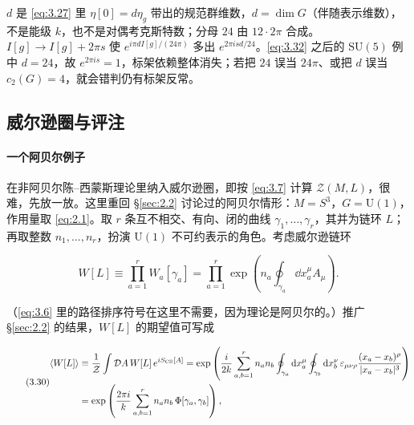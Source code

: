\begin{yizhu}[易错点]
$d$ 是 \eqref{eq:3.27} 里 $\eta[0]=d\eta_g$ 带出的规范群维数，$d=\dim G$（伴随表示维数），不是能级 $k$，也不是对偶考克斯特数；分母 $24$ 由 $12\cdot2\pi$ 合成。$I[g]\longrightarrow I[g]+2\pi s$ 使 $e^{i\pi dI[g]/(24\pi)}$ 多出 $e^{2\pi isd/24}$。\eqref{eq:3.32} 之后的 $\mathrm{SU}(5)$ 例中 $d=24$，故 $e^{2\pi is}=1$，标架依赖整体消失；若把 $24$ 误当 $24\pi$、或把 $d$ 误当 $c_2(G)=4$，就会错判仍有标架反常。
\end{yizhu}

\subsection{威尔逊圈与评注}\label{sec:3.4}

\paragraph{一个阿贝尔例子} 在非阿贝尔陈--西蒙斯理论里纳入威尔逊圈，即按 \eqref{eq:3.7} 计算 $\mathcal{Z}(M,L)$，很难，先放一放。这里重回 \S\ref{sec:2.2} 讨论过的阿贝尔情形：$M=S^3$，$G=\mathrm{U}(1)$，作用量取 \eqref{eq:2.1}。取 $r$ 条互不相交、有向、闭的曲线 $\gamma_1,\dots,\gamma_r$，其并为链环 $L$；再取整数 $n_1,\dots,n_r$，扮演 $\mathrm{U}(1)$ 不可约表示的角色。考虑威尔逊链环

\begin{equation}\tag{3.29}\label{eq:3.29}
  W[L] \equiv \prod_{a=1}^{r}W_a[\gamma_a]
  = \prod_{a=1}^{r}\exp\left(n_a\oint_{\gamma_a}\dd x_a^\mu A_\mu\right).
\end{equation}

（\eqref{eq:3.6} 里的路径排序符号在这里不需要，因为理论是阿贝尔的。）推广 \S\ref{sec:2.2} 的结果，$W[L]$ 的期望值可写成

\begin{equation}\tag{3.30}\label{eq:3.30}
\begin{aligned}
  \langle W[L]\rangle
  &\equiv \frac{1}{\mathcal{Z}}\int\mathcal{D}A\,W[L]\,e^{iS_{\mathrm{CS}}[A]}
  = \exp\left(\frac{i}{2k}\sum_{a,b=1}^{r}n_a n_b
    \oint_{\gamma_a}\mathrm{d} x_a^\mu\oint_{\gamma_b}\mathrm{d} x_b^\nu\,
    \varepsilon_{\mu\nu\rho}\frac{(x_a-x_b)^\rho}{|x_a-x_b|^3}\right)\\
  &= \exp\left(\frac{2\pi i}{k}\sum_{a,b=1}^{r}n_a n_b\,\Phi[\gamma_a,\gamma_b]\right),
\end{aligned}
\end{equation}

